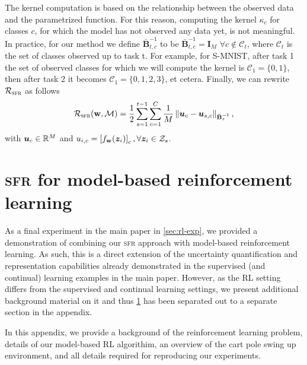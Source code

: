 \documentclass{article} %
\newcommand{\our}{\textsc{sfr}\xspace}
\newcommand{\weights}{\ensuremath{\mathbf{w}}}
\newcommand{\mbf}[1]{\mathbf{#1}}
\newcommand{\MB}{\mbf{B}}
\newcommand{\MZ}{\mbf{Z}}
\newcommand{\MI}{\mbf{I}}
\begin{document}
The kernel computation is based on the relationship between the observed data and the parametrized function. For this reason, computing the kernel $\kappa_c$ for classes $c$, for which the model has not observed any data yet, is not meaningful.
In practice, for our method we define $\bar{\MB}^{-1}_{t, c}$ to be $\bar{\MB}^{-1}_{t, c} = \MI_M$ $\forall c \not\in \mathcal{C}_t$, where $\mathcal{C}_t$ is the set of classes observed up to task t. For example, for S-MNIST, after task 1 the set of observed classes for which we will compute the kernel is $\mathcal{C}_1 = \{0, 1\}$, then after task 2 it becomes $\mathcal{C}_1 = \{0, 1, 2, 3\}$, et cetera.
Finally, we can rewrite $\mathcal{R}_\mathrm{\our}$ as follows
\begin{equation}\label{eq-cl-regularizer}%
  \mathcal{R}_\mathrm{\our}(\weights, \mathcal{M}) = \frac{1}{2} \sum_{s=1}^{t-1} \sum_{c=1}^{C} \frac{1}{M}
	\left\lVert
	\vu_c - \vu_{s,c} %
	\right\rVert_{\bar{\MB}^{-1}_{s}},
\end{equation}
%
with ${\bm{u}}_c \in \mathbb{R}^M$ and $u_{i, c} = \left[ f_{\weights}(\vz_{i}) \right]_c, \forall {\vz_i} \in \mathcal{Z}_s$.




\section{\our for model-based reinforcement learning}
\label{app:rl}
%
As a final experiment in the main paper in \cref{sec:rl-exp}, we provided a demonstration of combining our \our approach with model-based reinforcement learning. As such, this is a direct extension of the uncertainty quantification and representation capabilities already demonstrated in the supervised (and continual) learning examples in the main paper. However, as the RL setting differs from the supervised and continual learning settings, we present additional background material on it and thus \cref{app:rl} has been separated out to a separate section in the appendix.

In this appendix, we provide a background of the reinforcement learning problem, details of our
model-based RL algorithim, an overview of the cart pole swing up environment, and
all details required for reproducing our experiments.
\end{document}
